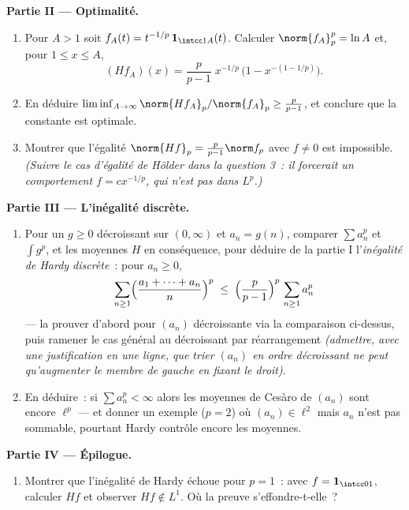 \begin{problem}
\medskip
\noindent\textbf{Partie II --- Optimalité.}
\begin{enumerate}[resume]
  \item Pour $A > 1$ soit $f_A(t) = t^{-1/p}\,\mathbf
        1_{\intcc1A}(t)$. Calculer $\norm{f_A}_p^p = \ln A$
        et, pour $1 \leq x \leq A$,
        \[
        (Hf_A)(x) = \frac p{p-1}\;x^{-1/p}\,
        \bigl(1 - x^{-(1 - 1/p)}\bigr).
        \]
  \item En déduire $\liminf_{A\to\infty} \norm{Hf_A}_p/
        \norm{f_A}_p \geq \frac{p}{p-1}$, et conclure que
        la constante est optimale.
  \item Montrer que l'égalité $\norm{Hf}_p = \frac
        p{p-1}\norm f_p$ avec $f \neq 0$ est impossible.
        \emph{(Suivre le cas d'égalité de Hölder dans la
        question 3~: il forcerait un comportement $f =
        cx^{-1/p}$, qui n'est pas dans $L^p$.)}
\end{enumerate}

\medskip
\noindent\textbf{Partie III --- L'inégalité discrète.}
\begin{enumerate}[resume]
  \item Pour un $g \geq 0$ décroissant sur $(0,\infty)$ et
        $a_n = g(n)$, comparer $\sum a_n^p$ et $\int g^p$,
        et les moyennes $H$ en conséquence, pour déduire de
        la partie I l'\emph{inégalité de Hardy discrète}~:
        pour $a_n \geq 0$,
        \[
        \sum_{n\geq1}\Bigl(\frac{a_1 + \dots +
        a_n}{n}\Bigr)^{p}
        \;\leq\;
        \Bigl(\frac{p}{p-1}\Bigr)^{p}\,\sum_{n\geq1}a_n^p
        \]
        --- la prouver d'abord pour $(a_n)$ décroissante via
        la comparaison ci-dessus, puis ramener le cas
        général au décroissant par réarrangement
        \emph{(admettre, avec une justification en une
        ligne, que trier $(a_n)$ en ordre décroissant ne
        peut qu'augmenter le membre de gauche en fixant le
        droit)}.
  \item En déduire~: si $\sum a_n^p < \infty$ alors les
        moyennes de Cesàro de $(a_n)$ sont encore
        $\ell^p$ --- et donner un exemple ($p = 2$) où
        $(a_n) \in \ell^2$ mais $a_n$ n'est pas sommable,
        pourtant Hardy contrôle encore les moyennes.
\end{enumerate}

\medskip
\noindent\textbf{Partie IV --- Épilogue.}
\begin{enumerate}[resume]
  \item Montrer que l'inégalité de Hardy échoue pour $p =
        1$~: avec $f = \mathbf 1_{\intcc01}$, calculer $Hf$
        et observer $Hf \notin L^1$. Où la preuve
        s'effondre-t-elle~?
\end{enumerate}


\end{problem}
